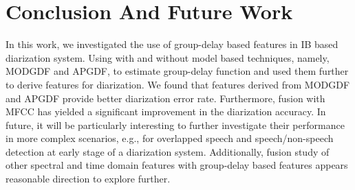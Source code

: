 \documentclass[conference]{IEEEtran}
\begin{document}
\section{Conclusion And Future Work}
\label{conclude}
In this work, we investigated the use of group-delay based features in IB based diarization system. Using with and without model based techniques, namely, MODGDF and APGDF, to estimate group-delay function and used them further to derive features for diarization. We found that features derived from MODGDF and APGDF provide better diarization error rate. Furthermore, fusion with MFCC has yielded a significant improvement in the diarization accuracy.  In future, it will be particularly interesting to further investigate their performance in more complex scenarios, e.g., for overlapped speech and speech/non-speech detection at early stage of a diarization system. Additionally, fusion study of other spectral and time domain features with group-delay based features appears reasonable direction to explore further. 



\end{document}
